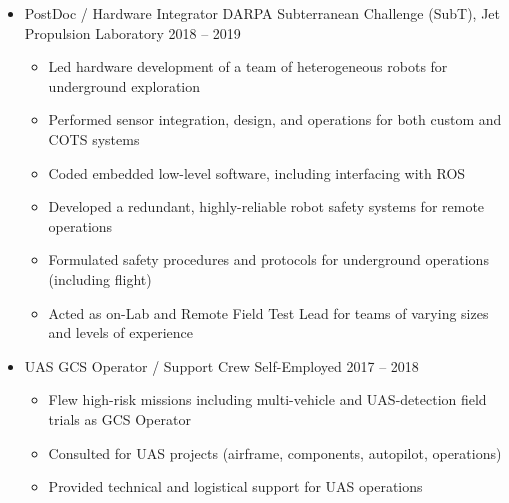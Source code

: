 \documentclass[12pt,letter,sans]{moderncv}
\begin{document}
\begin{itemize}
\vspace{4pt}

\item{\cventry
    {}
    {PostDoc / Hardware Integrator}
    {DARPA Subterranean Challenge (SubT), Jet Propulsion Laboratory}
    {2018 -- 2019}
    {}
    {  
        \vspace{3pt} 
        \begin{itemize}
            \item Led hardware development of a team of heterogeneous robots for underground exploration
            \item Performed sensor integration, design, and operations for both custom and COTS systems
            \item Coded embedded low-level software, including interfacing with ROS 
            \item Developed a redundant, highly-reliable robot safety systems for remote operations
            \item Formulated safety procedures and protocols for underground operations (including flight) 
            \item Acted as on-Lab and Remote Field Test Lead for teams of varying sizes and levels of experience 
        \end{itemize}
    }
}

\vspace{4pt}

\item{\cventry
    {}
    {UAS GCS Operator / Support Crew}
    {Self-Employed}
    {2017 -- 2018}
    {}
    {
        \vspace{3pt} 
        \begin{itemize}
            \item Flew high-risk missions including multi-vehicle and UAS-detection field trials as GCS Operator
            \item Consulted for UAS projects (airframe, components, autopilot, operations)
            \item Provided technical and logistical support for UAS operations
        \end{itemize}
        }
    }
    
\vspace{4pt}


\end{itemize}
\end{document}
